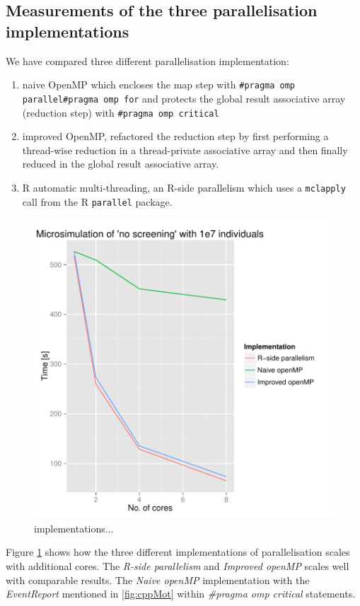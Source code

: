 \subsection{Measurements of the three parallelisation implementations}

We have compared three different parallelisation implementation: 
\begin{enumerate}
\item naive OpenMP which encloses the map step with \texttt{\#pragma omp parallel\#pragma
    omp for} and protects the global result associative array (reduction step) with \texttt{\#pragma omp critical}
\item improved OpenMP, refactored the reduction step by first
  performing a thread-wise reduction in a thread-private associative array and then
  finally reduced in the global result associative array.
\item R automatic multi-threading, an R-side parallelism which uses a \texttt{mclapply} call from the R
\texttt{parallel} package.
\end{enumerate}
\begin{figure}[!htbp] \centering
  \includegraphics[height=0.5\textheight]{images/implementationProfiling.pdf}
  \caption{implementations...}
  \label{fig:implScaling}
\end{figure} 
Figure \ref{fig:implScaling} shows how the three
different implementations of parallelisation scales with additional
cores. The \emph{R-side parallelism} and \emph{Improved openMP} scales
well with comparable results. The \emph{Naive openMP} implementation
with the \emph{EventReport} mentioned in \ref{fig:cppMot} within
\emph{\#pragma omp critical} statements.



